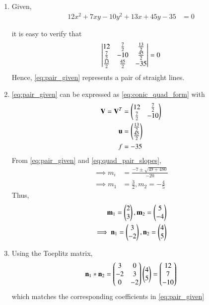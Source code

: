 \renewcommand{\theequation}{\theenumi}
\begin{enumerate}[label=\thesection.\arabic*.,ref=\thesection.\theenumi]

\item 
Given,
\begin{align}
    12x^2+7xy-10y^2+13x+45y-35&=0 
\label{eq:pair_given}
\end{align}

it is easy to verify that
\begin{align}
\begin{vmatrix}
12 &\frac{7}{2}& \frac{13}{2}
\\
\frac{7}{2} & -10 & \frac{45}{2}
\\ 
\frac{13}{2} & \frac{45}{2} & -35
\end{vmatrix} = 0
\end{align}
%
Hence, \eqref{eq:pair_given} represents a pair of straight lines.
%
\item \eqref{eq:pair_given} can be expressed as \eqref{eq:conic_quad_form} with
\begin{align}
    \mathbf{V}=\mathbf{V}^T&=\begin{pmatrix}12 & \frac{7}{2}\\\frac{7}{2} &-10\end{pmatrix}\label{eq:pair_v}\\
    \mathbf{u}&=\begin{pmatrix}\frac{13}{2} \\ \frac{45}{2}\end{pmatrix}\label{eq:pair_u}\\
    f&=-35\label{eq:pair_fv}
\end{align}
From \eqref{eq:pair_given} and \eqref{eq:quad_pair_slopes},
\begin{align}
\label{eq:quad_pair_slopes_ex}
\implies m_i &= \frac{-7 \pm \sqrt{49+480}}{-20}
\\
\implies m_1 &=  \frac{3}{2}, m_2 = -\frac{4}{5}
\end{align}
Thus,
\begin{align}
\mathbf{m}_1 = \begin{pmatrix}2\\3\end{pmatrix},
\mathbf{m}_2 = \begin{pmatrix}5\\-4\end{pmatrix}
\\
\implies
\mathbf{n}_1 = \begin{pmatrix}3\\-2\end{pmatrix},
\mathbf{n}_2 = \begin{pmatrix}4\\5\end{pmatrix}
\label{eq:quad_pair_norm_vec}
\end{align}
\item Using the Toeplitz matrix,
\begin{align}
\mathbf{n}_1*\mathbf{n}_2 = 
\begin{pmatrix}3 & 0
\\
-2 & 3
\\
0 & -2
\end{pmatrix}
\begin{pmatrix}4\\5\end{pmatrix}
= \begin{pmatrix}12 \\ 7 \\ -10\end{pmatrix}
\end{align}
%
which matches the corresponding coefficients in \eqref{eq:pair_given}


\end{enumerate}
